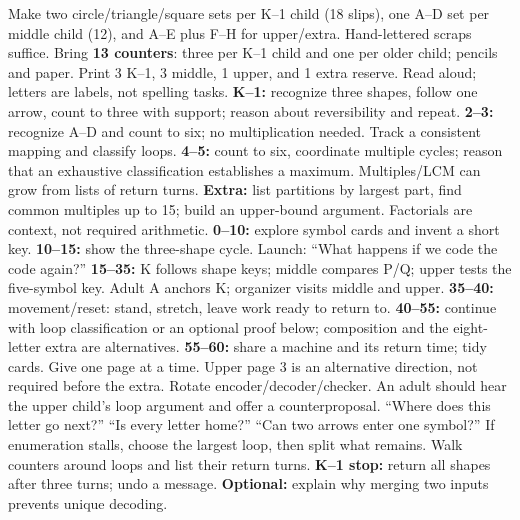 \documentclass[12pt]{extarticle}
\begin{document}
Make two circle/triangle/square sets per K--1 child (18 slips), one A--D set per middle child (12), and A--E plus F--H for upper/extra. Hand-lettered scraps suffice. Bring \textbf{13 counters}: three per K--1 child and one per older child; pencils and paper. Print 3 K--1, 3 middle, 1 upper, and 1 extra reserve. Read aloud; letters are labels, not spelling tasks.
\textbf{K--1:} recognize three shapes, follow one arrow, count to three with support; reason about reversibility and repeat. \textbf{2--3:} recognize A--D and count to six; no multiplication needed. Track a consistent mapping and classify loops. \textbf{4--5:} count to six, coordinate multiple cycles; reason that an exhaustive classification establishes a maximum. Multiples/LCM can grow from lists of return turns. \textbf{Extra:} list partitions by largest part, find common multiples up to 15; build an upper-bound argument. Factorials are context, not required arithmetic.
\textbf{0--10:} explore symbol cards and invent a short key. \textbf{10--15:} show the three-shape cycle. Launch: ``What happens if we code the code again?'' \textbf{15--35:} K follows shape keys; middle compares P/Q; upper tests the five-symbol key. Adult A anchors K; organizer visits middle and upper. \textbf{35--40:} movement/reset: stand, stretch, leave work ready to return to. \textbf{40--55:} continue with loop classification or an optional proof below; composition and the eight-letter extra are alternatives. \textbf{55--60:} share a machine and its return time; tidy cards.
Give one page at a time. Upper page 3 is an alternative direction, not required before the extra. Rotate encoder/decoder/checker. An adult should hear the upper child's loop argument and offer a counterproposal.
``Where does this letter go next?'' ``Is every letter home?'' ``Can two arrows enter one symbol?'' If enumeration stalls, choose the largest loop, then split what remains. Walk counters around loops and list their return turns.
\textbf{K--1 stop:} return all shapes after three turns; undo a message. \textbf{Optional:} explain why merging two inputs prevents unique decoding.\par
\end{document}
